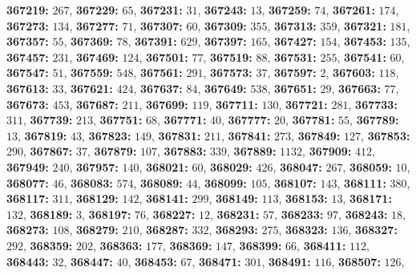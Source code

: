 \textsf{\bfseries 367219:} $267$, \textsf{\bfseries 367229:} $65$, \textsf{\bfseries 367231:} $31$, \textsf{\bfseries 367243:} $13$, \textsf{\bfseries 367259:} $74$, \textsf{\bfseries 367261:} $174$, \textsf{\bfseries 367273:} $134$, \textsf{\bfseries 367277:} $71$, \textsf{\bfseries 367307:} $60$, \textsf{\bfseries 367309:} $355$, \textsf{\bfseries 367313:} $359$, \textsf{\bfseries 367321:} $181$, \textsf{\bfseries 367357:} $55$, \textsf{\bfseries 367369:} $78$, \textsf{\bfseries 367391:} $629$, \textsf{\bfseries 367397:} $165$, \textsf{\bfseries 367427:} $154$, \textsf{\bfseries 367453:} $135$, \textsf{\bfseries 367457:} $231$, \textsf{\bfseries 367469:} $124$, \textsf{\bfseries 367501:} $77$, \textsf{\bfseries 367519:} $88$, \textsf{\bfseries 367531:} $255$, \textsf{\bfseries 367541:} $60$, \textsf{\bfseries 367547:} $51$, \textsf{\bfseries 367559:} $548$, \textsf{\bfseries 367561:} $291$, \textsf{\bfseries 367573:} $37$, \textsf{\bfseries 367597:} $2$, \textsf{\bfseries 367603:} $118$, \textsf{\bfseries 367613:} $33$, \textsf{\bfseries 367621:} $424$, \textsf{\bfseries 367637:} $84$, \textsf{\bfseries 367649:} $538$, \textsf{\bfseries 367651:} $29$, \textsf{\bfseries 367663:} $77$, \textsf{\bfseries 367673:} $453$, \textsf{\bfseries 367687:} $211$, \textsf{\bfseries 367699:} $119$, \textsf{\bfseries 367711:} $130$, \textsf{\bfseries 367721:} $281$, \textsf{\bfseries 367733:} $311$, \textsf{\bfseries 367739:} $213$, \textsf{\bfseries 367751:} $68$, \textsf{\bfseries 367771:} $40$, \textsf{\bfseries 367777:} $20$, \textsf{\bfseries 367781:} $55$, \textsf{\bfseries 367789:} $13$, \textsf{\bfseries 367819:} $43$, \textsf{\bfseries 367823:} $149$, \textsf{\bfseries 367831:} $211$, \textsf{\bfseries 367841:} $273$, \textsf{\bfseries 367849:} $127$, \textsf{\bfseries 367853:} $290$, \textsf{\bfseries 367867:} $37$, \textsf{\bfseries 367879:} $107$, \textsf{\bfseries 367883:} $339$, \textsf{\bfseries 367889:} $1132$, \textsf{\bfseries 367909:} $412$, \textsf{\bfseries 367949:} $240$, \textsf{\bfseries 367957:} $140$, \textsf{\bfseries 368021:} $60$, \textsf{\bfseries 368029:} $426$, \textsf{\bfseries 368047:} $267$, \textsf{\bfseries 368059:} $10$, \textsf{\bfseries 368077:} $46$, \textsf{\bfseries 368083:} $574$, \textsf{\bfseries 368089:} $44$, \textsf{\bfseries 368099:} $105$, \textsf{\bfseries 368107:} $143$, \textsf{\bfseries 368111:} $380$, \textsf{\bfseries 368117:} $311$, \textsf{\bfseries 368129:} $142$, \textsf{\bfseries 368141:} $299$, \textsf{\bfseries 368149:} $113$, \textsf{\bfseries 368153:} $13$, \textsf{\bfseries 368171:} $132$, \textsf{\bfseries 368189:} $3$, \textsf{\bfseries 368197:} $76$, \textsf{\bfseries 368227:} $12$, \textsf{\bfseries 368231:} $57$, \textsf{\bfseries 368233:} $97$, \textsf{\bfseries 368243:} $18$, \textsf{\bfseries 368273:} $108$, \textsf{\bfseries 368279:} $210$, \textsf{\bfseries 368287:} $332$, \textsf{\bfseries 368293:} $275$, \textsf{\bfseries 368323:} $136$, \textsf{\bfseries 368327:} $292$, \textsf{\bfseries 368359:} $202$, \textsf{\bfseries 368363:} $177$, \textsf{\bfseries 368369:} $147$, \textsf{\bfseries 368399:} $66$, \textsf{\bfseries 368411:} $112$, \textsf{\bfseries 368443:} $32$, \textsf{\bfseries 368447:} $40$, \textsf{\bfseries 368453:} $67$, \textsf{\bfseries 368471:} $301$, \textsf{\bfseries 368491:} $116$, \textsf{\bfseries 368507:} $126$, 
